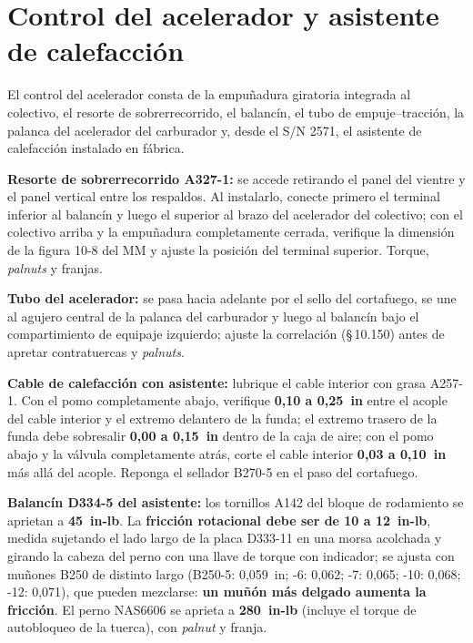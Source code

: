 \section{Control del acelerador y asistente de calefacción}

El control del acelerador consta de la empuñadura giratoria integrada al colectivo, el resorte de sobrerrecorrido, el balancín, el tubo de empuje--tracción, la palanca del acelerador del carburador y, desde el S/N 2571, el asistente de calefacción instalado en fábrica.

\textbf{Resorte de sobrerrecorrido A327-1:} se accede retirando el panel del vientre y el panel vertical entre los respaldos. Al instalarlo, conecte primero el terminal inferior al balancín y luego el superior al brazo del acelerador del colectivo; con el colectivo arriba y la empuñadura completamente cerrada, verifique la dimensión de la figura 10-8 del MM y ajuste la posición del terminal superior. Torque, \emph{palnuts} y franjas.

\textbf{Tubo del acelerador:} se pasa hacia adelante por el sello del cortafuego, se une al agujero central de la palanca del carburador y luego al balancín bajo el compartimiento de equipaje izquierdo; ajuste la correlación (\S\,10.150) antes de apretar contratuercas y \emph{palnuts}.

\textbf{Cable de calefacción con asistente:} lubrique el cable interior con grasa A257-1. Con el pomo completamente abajo, verifique \textbf{0,10 a 0,25~in} entre el acople del cable interior y el extremo delantero de la funda; el extremo trasero de la funda debe sobresalir \textbf{0,00 a 0,15~in} dentro de la caja de aire; con el pomo abajo y la válvula completamente atrás, corte el cable interior \textbf{0,03 a 0,10~in} más allá del acople. Reponga el sellador B270-5 en el paso del cortafuego.

\textbf{Balancín D334-5 del asistente:} los tornillos A142 del bloque de rodamiento se aprietan a \textbf{45~in-lb}. La \textbf{fricción rotacional debe ser de 10 a 12~in-lb}, medida sujetando el lado largo de la placa D333-11 en una morsa acolchada y girando la cabeza del perno con una llave de torque con indicador; se ajusta con muñones B250 de distinto largo (B250-5: 0,059~in; -6: 0,062; -7: 0,065; -10: 0,068; -12: 0,071), que pueden mezclarse: \textbf{un muñón más delgado aumenta la fricción}. El perno NAS6606 se aprieta a \textbf{280~in-lb} (incluye el torque de autobloqueo de la tuerca), con \emph{palnut} y franja.
